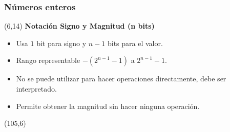 \documentclass[aspectratio=169]{beamer}
\begin{document}
\begin{frame}[fragile]
    \frametitle{Números enteros}
    \begin{textblock}{90}(6,14)
    \textbf{Notación Signo y Magnitud (n bits)}
    \begin{itemize} \small
    \item Usa $1$ bit para signo y $n-1$ bits para el valor.
    \item Rango representable $-(2^{n-1}-1)$ a $2^{n-1}-1$.
    \item No se puede utilizar para hacer operaciones directamente, debe ser interpretado.
    \item Permite obtener la magnitud sin hacer ninguna operación.
    \end{itemize}
    \end{textblock}
    
    \begin{textblock}{90}(105,6)
    \end{textblock}
\end{frame}
\end{document}
